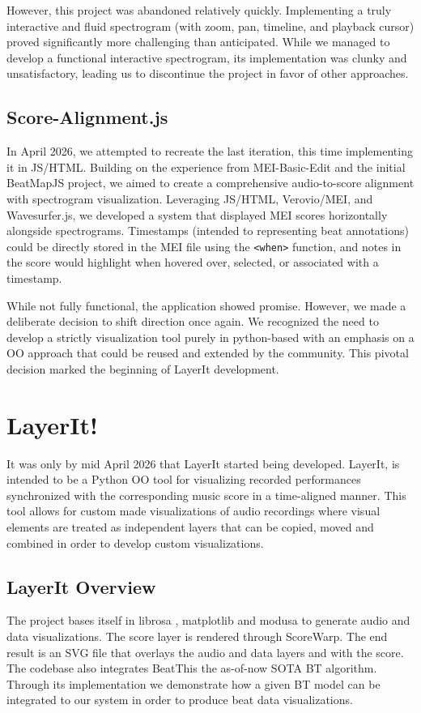 However, this project was abandoned relatively quickly. Implementing a truly interactive and fluid spectrogram (with zoom, pan, timeline, and playback cursor) proved significantly more challenging than anticipated. While we managed to develop a functional interactive spectrogram, its implementation was clunky and unsatisfactory, leading us to discontinue the project in favor of other approaches. 

\subsection{Score-Alignment.js}
In April 2026, we attempted to recreate the last iteration, this time implementing it in \ac{JS}/\ac{HTML}. Building on the experience from MEI-Basic-Edit and the initial BeatMapJS project, we aimed to create a comprehensive audio-to-score alignment with spectrogram visualization. Leveraging \ac{JS}/\ac{HTML}, Verovio/\ac{MEI}, and Wavesurfer.js, we developed a system that displayed \ac{MEI} scores horizontally alongside spectrograms. Timestamps (intended to representing beat annotations) could be directly stored in the \ac{MEI} file using the \texttt{<when>} function, and notes in the score would highlight when hovered over, selected, or associated with a timestamp.

While not fully functional, the application showed promise. However, we made a deliberate decision to shift direction once again. We recognized the need to develop a strictly visualization tool purely in python-based with an emphasis on a \ac{OO} approach that could be reused and extended by the community. This pivotal decision marked the beginning of LayerIt development.

\pagebreak
\section{LayerIt!}

It was only by mid April 2026 that LayerIt started being developed. LayerIt, is intended to be a Python \ac{OO} tool for visualizing recorded performances synchronized with the corresponding music score in a time-aligned manner. This tool allows for custom made visualizations of audio recordings where visual elements are treated as independent layers that can be copied, moved and combined in order to develop custom visualizations. 

\subsection{LayerIt Overview}
The project bases itself in librosa \cite{mcfeeLibrosaLibrosa01102025}, matplotlib \cite{thematplotlibdevelopmentteamMatplotlibVisualizationPython2026} and modusa \cite{modusa} to generate audio and data visualizations. The score  layer is rendered through ScoreWarp. The end result is an \ac{SVG} file that overlays the audio and data layers and with the score. The codebase also integrates BeatThis the as-of-now \ac{SOTA} \ac{BT} algorithm. Through its implementation we demonstrate how a given \ac{BT} model can be integrated to our system in order to produce beat data visualizations.

